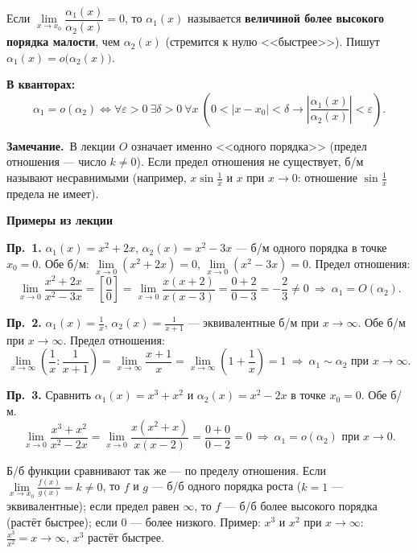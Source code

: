 \documentclass[a4paper,11pt]{article}
\newcommand{\eps}{\varepsilon}
\newcommand{\kv}{\par\noindent\textbf{\textcolor{oprc!85!black}{В кванторах:}}}
\newcommand{\zam}{\par\smallskip\noindent\textbf{\textcolor{zamc}{Замечание.}}\ }
\newcommand{\podr}[1]{\par\needspace{8\baselineskip}\medskip
  {\large\bfseries\textcolor{oprc!80!black}{#1}}\par\nopagebreak\smallskip}
\begin{document}
\begin{opr}
Если $\lim\limits_{x \to x_0} \dfrac{\alpha_1(x)}{\alpha_2(x)} = 0$, то $\alpha_1(x)$ называется \textbf{величиной более высокого порядка малости},
чем $\alpha_2(x)$ (стремится к нулю <<быстрее>>). Пишут $\alpha_1(x) = o\bigl(\alpha_2(x)\bigr)$.
\kv
\[
  \alpha_1 = o(\alpha_2) \Leftrightarrow \forall \eps > 0\ \exists \delta > 0\ \forall x\
  \left( 0 < |x - x_0| < \delta \to \left|\frac{\alpha_1(x)}{\alpha_2(x)}\right| < \eps \right).
\]
\end{opr}

\zam В лекции $O$ означает именно <<одного порядка>> (предел отношения --- число $k \ne 0$). Если предел отношения не существует,
б/м называют несравнимыми (например, $x \sin\frac1x$ и $x$ при $x \to 0$: отношение $\sin\frac1x$ предела не имеет).

\podr{Примеры из лекции}

\textbf{Пр.~1.} $\alpha_1(x) = x^2 + 2x$, $\alpha_2(x) = x^2 - 3x$ --- б/м одного порядка в точке $x_0 = 0$.
Обе б/м: $\lim\limits_{x \to 0} (x^2 + 2x) = 0$, $\lim\limits_{x \to 0} (x^2 - 3x) = 0$. Предел отношения:
\[
  \lim_{x \to 0} \frac{x^2 + 2x}{x^2 - 3x}
  = \left[\frac{0}{0}\right]
  = \lim_{x \to 0} \frac{x(x + 2)}{x(x - 3)}
  = \frac{0 + 2}{0 - 3} = -\frac{2}{3} \ne 0
  \ \Longrightarrow\ \alpha_1 = O(\alpha_2).
\]

\textbf{Пр.~2.} $\alpha_1(x) = \frac{1}{x}$, $\alpha_2(x) = \frac{1}{x + 1}$ --- эквивалентные б/м при $x \to \infty$.
Обе б/м при $x \to \infty$. Предел отношения:
\[
  \lim_{x \to \infty} \left(\frac{1}{x} : \frac{1}{x + 1}\right)
  = \lim_{x \to \infty} \frac{x + 1}{x}
  = \lim_{x \to \infty} \left(1 + \frac{1}{x}\right) = 1
  \ \Longrightarrow\ \alpha_1 \sim \alpha_2 \text{ при } x \to \infty.
\]

\textbf{Пр.~3.} Сравнить $\alpha_1(x) = x^3 + x^2$ и $\alpha_2(x) = x^2 - 2x$ в точке $x_0 = 0$. Обе б/м.
\[
  \lim_{x \to 0} \frac{x^3 + x^2}{x^2 - 2x}
  = \lim_{x \to 0} \frac{x(x^2 + x)}{x(x - 2)}
  = \frac{0 + 0}{0 - 2} = 0
  \ \Longrightarrow\ \alpha_1 = o(\alpha_2) \text{ при } x \to 0.
\]

\begin{dop}
Б/б функции сравнивают так же --- по пределу отношения. Если $\lim\limits_{x \to x_0} \frac{f(x)}{g(x)} = k \ne 0$, то $f$ и $g$ ---
б/б одного порядка роста ($k = 1$ --- эквивалентные); если предел равен $\infty$, то $f$ --- б/б более высокого порядка (растёт быстрее);
если $0$ --- более низкого. Пример: $x^3$ и $x^2$ при $x \to \infty$: $\frac{x^3}{x^2} = x \to \infty$, $x^3$ растёт быстрее.
\end{dop}
\end{document}
